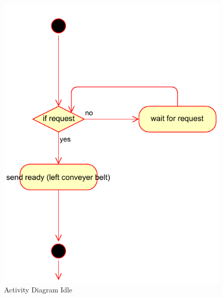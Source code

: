 \documentclass[a4paper,12pt,twoside]{scrreprt}
\begin{document}
\begin{figure}[H]
	\centering
	\includegraphics[width=\textwidth,height=\textheight,keepaspectratio]{activityDiagram/activitychartIdleState.pdf}
	\caption[Activity Diagram Idle]{Activity Diagram Idle}
	\label{fig:ActivityDiagramIdle}
\end{figure}
\end{document}
